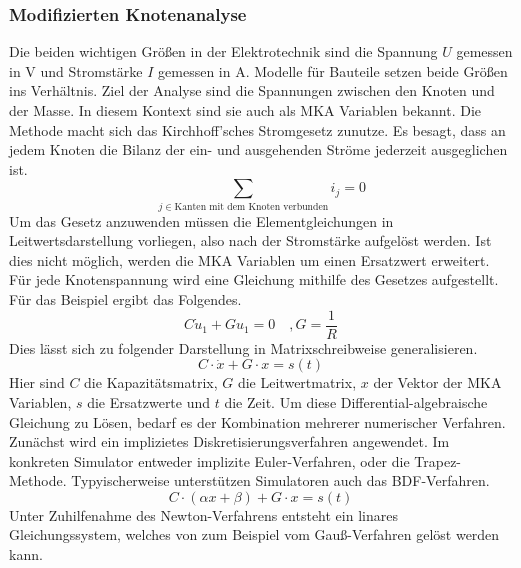 \subsubsection*{Modifizierten Knotenanalyse}
Die beiden wichtigen Größen in der Elektrotechnik sind die Spannung $U$ gemessen in V und Stromstärke $I$ gemessen in A. Modelle für Bauteile setzen beide Größen ins Verhältnis. Ziel der Analyse sind die Spannungen zwischen den Knoten und der Masse. In diesem Kontext sind sie auch als MKA Variablen bekannt. Die Methode macht sich das Kirchhoff’sches Stromgesetz zunutze. Es besagt, dass an jedem Knoten die Bilanz der ein- und ausgehenden Ströme jederzeit ausgeglichen ist.
\begin{displaymath}
    \sum_{j \in \textrm{Kanten mit dem Knoten verbunden}} i_{j} = 0
\end{displaymath}
Um das Gesetz anzuwenden müssen die Elementgleichungen in Leitwertsdarstellung vorliegen, also nach der Stromstärke aufgelöst werden. Ist dies nicht möglich, werden die MKA Variablen um einen Ersatzwert erweitert. Für jede Knotenspannung wird eine Gleichung mithilfe des Gesetzes aufgestellt. Für das Beispiel ergibt das Folgendes.
\begin{displaymath}
    C\dot{u}_1 + Gu_1 = 0\quad, G=\frac{1}{R}
\end{displaymath}
Dies lässt sich zu folgender Darstellung in Matrixschreibweise generalisieren.
\begin{displaymath}
    C \cdot \dot{x} + G \cdot x = s(t)
\end{displaymath}
Hier sind $C$ die Kapazitätsmatrix, $G$ die Leitwertmatrix, $x$ der Vektor der MKA Variablen, $s$ die Ersatzwerte und $t$ die Zeit. Um diese Differential-algebraische Gleichung zu Lösen, bedarf es der Kombination mehrerer numerischer Verfahren. Zunächst wird ein implizietes Diskretisierungsverfahren angewendet. Im konkreten Simulator entweder implizite Euler-Verfahren, oder die Trapez-Methode. Typyischerweise unterstützen Simulatoren auch das BDF-Verfahren.
\begin{displaymath}
    C \cdot (\alpha x + \beta) + G \cdot x = s(t)
\end{displaymath}
Unter Zuhilfenahme des Newton-Verfahrens entsteht ein linares Gleichungssystem, welches von zum Beispiel vom Gauß-Verfahren gelöst werden kann.